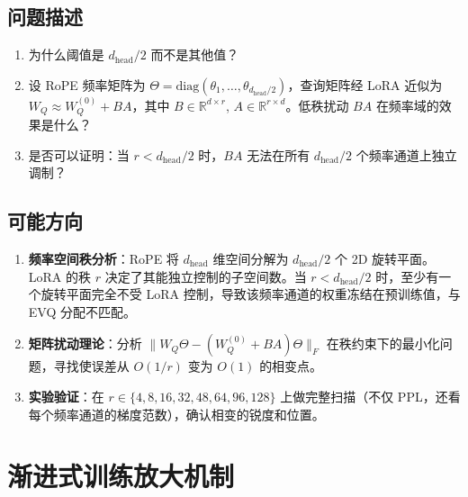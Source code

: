\documentclass[11pt,a4paper]{article}
\newcommand{\zh}[1]{{\zhfont #1}}
\begin{document}
\subsection*{\zh{问题描述}}
\begin{enumerate}[leftmargin=2em]
  \item \zh{为什么阈值是} $d_{\mathrm{head}}/2$ \zh{而不是其他值？}
  \item \zh{设} RoPE \zh{频率矩阵为} $\Theta = \mathrm{diag}(\theta_1, \ldots, \theta_{d_{\mathrm{head}}/2})$\zh{，查询矩阵经} LoRA \zh{近似为} $W_Q \approx W_Q^{(0)} + BA$\zh{，其中} $B \in \mathbb{R}^{d \times r}$, $A \in \mathbb{R}^{r \times d}$\zh{。低秩扰动} $BA$ \zh{在频率域的效果是什么？}
  \item \zh{是否可以证明：当} $r < d_{\mathrm{head}}/2$ \zh{时，}$BA$ \zh{无法在所有} $d_{\mathrm{head}}/2$ \zh{个频率通道上独立调制？}
\end{enumerate}

\subsection*{\zh{可能方向}}
\begin{enumerate}[leftmargin=2em]
  \item \textbf{\zh{频率空间秩分析}}\zh{：}RoPE \zh{将} $d_{\mathrm{head}}$ \zh{维空间分解为} $d_{\mathrm{head}}/2$ \zh{个} 2D \zh{旋转平面。}LoRA \zh{的秩} $r$ \zh{决定了其能独立控制的子空间数。当} $r < d_{\mathrm{head}}/2$ \zh{时，至少有一个旋转平面完全不受} LoRA \zh{控制，导致该频率通道的权重冻结在预训练值，与} EVQ \zh{分配不匹配。}
  \item \textbf{\zh{矩阵扰动理论}}\zh{：分析} $\|W_Q \Theta - (W_Q^{(0)}+BA)\Theta\|_F$ \zh{在秩约束下的最小化问题，寻找使误差从} $O(1/r)$ \zh{变为} $O(1)$ \zh{的相变点。}
  \item \textbf{\zh{实验验证}}\zh{：在} $r \in \{4, 8, 16, 32, 48, 64, 96, 128\}$ \zh{上做完整扫描（不仅} PPL\zh{，还看每个频率通道的梯度范数），确认相变的锐度和位置。}
\end{enumerate}

\vspace{12pt}

\section{\zh{渐进式训练放大机制}}
\end{document}
